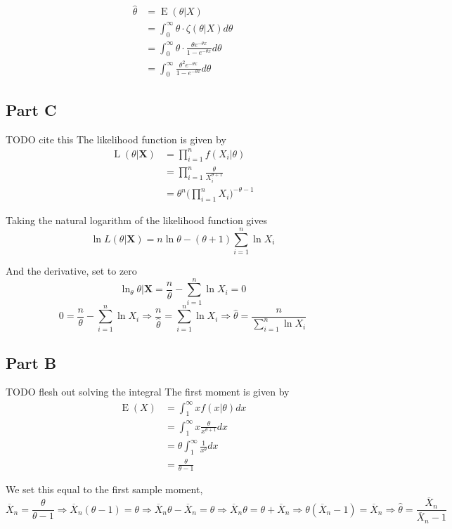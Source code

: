 \documentclass{article}
\begin{document}
\begin{align*}
    \hat{\theta} &= \operatorname{E}(\theta | X) \\
    &= \int_{0}^{\infty} \theta \cdot \zeta(\theta | X) d\theta \\
    &= \int_{0}^{\infty} \theta \cdot \frac{\theta e^{-\theta x}}{1 - e^{-\theta x}} d\theta \\
    &= \boxed{\int_{0}^{\infty} \frac{\theta^2 e^{-\theta x}}{1 - e^{-\theta x}} d\theta}
\end{align*}

\subsection*{Part C}


TODO cite this
The likelihood function is given by
\begin{align*}
    \operatorname{L}(\theta | \bm{X}) &= \prod_{i = 1}^n f(X_i | \theta)\\
    &= \prod_{i = 1}^n \frac{\theta}{X_i^{\theta + 1}}\\
    &= \theta^n \Bigg(\prod_{i = 1}^n X_i\Bigg)^{-\theta - 1}
\end{align*}

Taking the natural logarithm of the likelihood function gives
\[
    \ln{L(\theta | \bm{X})} = n\ln{\theta} - (\theta + 1)\sum_{i = 1}^n \ln{X_i}
\]

And the derivative, set to zero
\[
    \operatorname{ln}_\theta \theta | \bm{X} = \frac{n}{\theta} - \sum_{i = 1}^n \ln{X_i} = 0
\]
\[
    0 = \frac{n}{\theta} - \sum_{i = 1}^n \ln{X_i} \Longrightarrow \frac{n}{\hat{\theta}} = \sum_{i = 1}^n \ln{X_i} \Longrightarrow \boxed{\hat{\theta} = \frac{n}{\sum_{i = 1}^n \ln{X_i}}}
\]

\subsection*{Part B}

TODO flesh out solving the integral
The first moment is given by
\begin{align*}
    \operatorname{E}(X) &= \int_1^\infty xf(x|\theta)dx\\
    &= \int_1^\infty x\frac{\theta}{x^{\theta + 1}} dx\\
    &= \theta \int_1^\infty \frac{1}{x^\theta}dx\\
    &= \frac{\theta}{\theta - 1}
\end{align*}

We set this equal to the first sample moment,
\[
    \overline{X}_n = \frac{\theta}{\theta - 1} \Longrightarrow \overline{X}_n(\theta - 1) = \theta \Longrightarrow \overline{X}_n \theta - \overline{X}_n = \theta \Longrightarrow \overline{X}_n \theta = \theta + \overline{X}_n \Longrightarrow \theta(\overline{X}_n - 1) = \overline{X}_n \Longrightarrow \boxed{\hat{\theta} = \frac{\overline{X}_n}{\overline{X}_n - 1}}
\]
\end{document}
